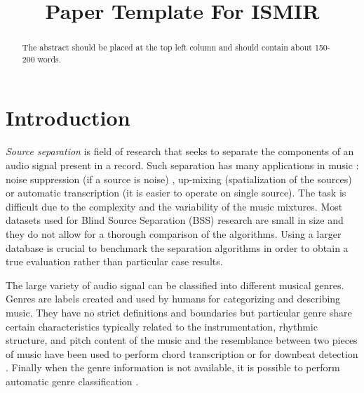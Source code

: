 \documentclass{article}
\title{Paper Template For ISMIR \conferenceyear}
\begin{document}
%
\maketitle
%
\begin{abstract}
The abstract should be placed at the top left column and should contain about 150-200 words.
\end{abstract}
%
\section{Introduction}\label{sec:introduction}


\emph{Source separation} is field of ​​research that seeks to separate the components of an audio signal present in a record. Such separation has many applications in music : noise suppression \cite{boll1979suppression} (if a source is noise) , up-mixing \cite{fitzgerald2011upmixing}(spatialization of the sources) or automatic transcription \cite{Bertin07} (it is easier to operate on single source). The task is difficult due to the complexity and the variability of the music mixtures. Most datasets used for Blind Source Separation (BSS) research are small in size and they do not allow for a thorough comparison of the algorithms. Using a larger database is crucial to benchmark the separation algorithms in order to obtain a true evaluation rather than particular case results. 

The large variety of audio signal can be classified into different musical genres. Genres are labels created and used by humans for categorizing and describing music. They have no strict definitions and boundaries but particular genre share certain characteristics typically related to the instrumentation, rhythmic structure, and pitch content of the music and the resemblance between two pieces of music have been used to perform chord transcription \cite{ni2012using,lee2008acoustic} or for downbeat detection \cite{hockman2012one}. Finally when the genre information is not available, it is possible to perform automatic genre classification \cite{li2003comparative}.
\end{document}
